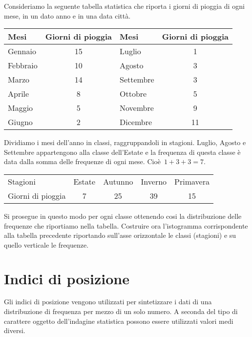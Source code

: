 \begin{esempio}
Consideriamo la seguente tabella statistica che riporta i giorni di pioggia 
di ogni mese, in un dato anno e in una data città.

\begin{center}
\begin{tabular}{lclc}
\toprule
Mesi & Giorni di pioggia &Mesi & Giorni di pioggia\\
\midrule
Gennaio & 15&Luglio & 1 \\
Febbraio & 10 &Agosto & 3\\
Marzo & 14 &Settembre & 3\\
Aprile & 8 &Ottobre & 5\\
Maggio & 5 &Novembre & 9\\
Giugno & 2 &Dicembre & 11\\
\bottomrule
\end{tabular}
\end{center}
Dividiamo i mesi dell'anno in classi, raggruppandoli in stagioni. Luglio, 
Agosto e Settembre
appartengono alla classe dell'Estate e la frequenza di questa classe è data 
dalla somma delle frequenze di ogni mese.
Cioè~$1 + 3 + 3 = 7$.
\begin{center}
\begin{tabular}{lcccc}
\toprule
Stagioni & Estate & Autunno & Inverno& Primavera\\
Giorni di pioggia & 7 & 25 & 39 & 15 \\
\bottomrule
\end{tabular}
\end{center}
Si prosegue in questo modo per ogni classe ottenendo cosi la distribuzione 
delle frequenze che riportiamo nella tabella.
Costruire ora l'istogramma corrispondente alla tabella precedente 
riportando sull'asse orizzontale le classi (stagioni) e su quello verticale 
le frequenze.
 \end{esempio}


\section{Indici di posizione}
\label{sec:A_medie}

Gli indici di posizione vengono utilizzati per sintetizzare i dati di una 
distribuzione di frequenza per mezzo di un solo numero.
A seconda del tipo di carattere oggetto dell'indagine statistica possono 
essere utilizzati valori medi diversi.

